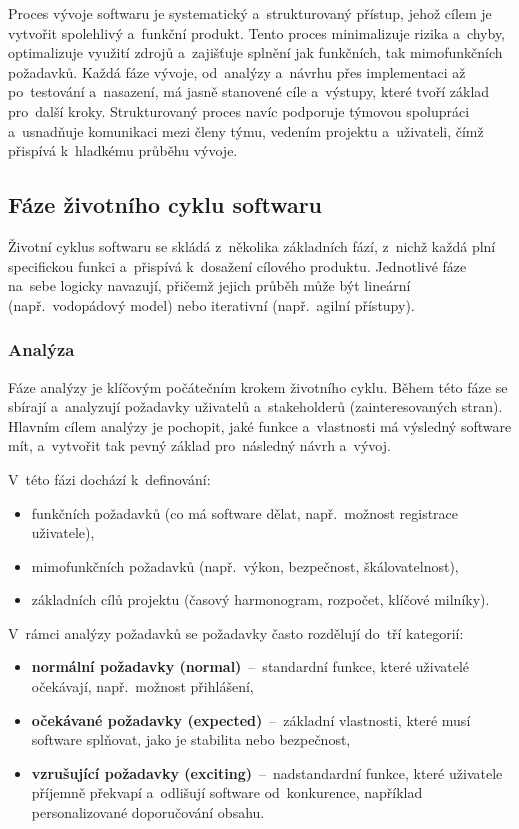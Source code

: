 \documentclass[male,czech,api_bc]{kitheses}
\begin{document}
Proces vývoje softwaru je systematický a~strukturovaný přístup, jehož cílem je vytvořit spolehlivý a~funkční produkt. Tento proces minimalizuje rizika a~chyby, optimalizuje využití zdrojů a~zajišťuje splnění jak funkčních, tak mimofunkčních požadavků. Každá fáze vývoje, od~analýzy a~návrhu přes implementaci až po~testování a~nasazení, má jasně stanovené cíle a~výstupy, které tvoří základ pro~další kroky. Strukturovaný proces navíc podporuje týmovou spolupráci a~usnadňuje komunikaci mezi členy týmu, vedením projektu a~uživateli, čímž přispívá k~hladkému průběhu vývoje.

\subsection{Fáze životního cyklu softwaru}

Životní cyklus softwaru se skládá z~několika základních fází, z~nichž každá plní specifickou funkci a~přispívá k~dosažení cílového produktu. Jednotlivé fáze na~sebe logicky navazují, přičemž jejich průběh může být lineární (např.~vodopádový model) nebo iterativní (např.~agilní přístupy).

\subsubsection{Analýza}

Fáze analýzy je klíčovým počátečním krokem životního cyklu. Během této fáze se sbírají a~analyzují požadavky uživatelů a~stakeholderů (zainteresovaných stran). Hlavním cílem analýzy je pochopit, jaké funkce a~vlastnosti má výsledný software mít, a~vytvořit tak pevný základ pro~následný návrh a~vývoj.

V~této fázi dochází k~definování:
\begin{itemize}
	\item funkčních požadavků (co má software dělat, např.~možnost registrace uživatele),
	\item mimofunkčních požadavků (např.~výkon, bezpečnost, škálovatelnost),
	\item základních cílů projektu (časový harmonogram, rozpočet, klíčové milníky).
\end{itemize}

V~rámci analýzy požadavků se požadavky často rozdělují do~tří kategorií:
\begin{itemize}
	\item \textbf{normální požadavky (normal)}~--~standardní funkce, které uživatelé očekávají, např.~možnost přihlášení,
	\item \textbf{očekávané požadavky (expected)}~--~základní vlastnosti, které musí software splňovat, jako je stabilita nebo bezpečnost,
	\item \textbf{vzrušující požadavky (exciting)}~--~nadstandardní funkce, které uživatele příjemně překvapí a~odlišují software od~konkurence, například personalizované doporučování obsahu.
\end{itemize}
\end{document}
